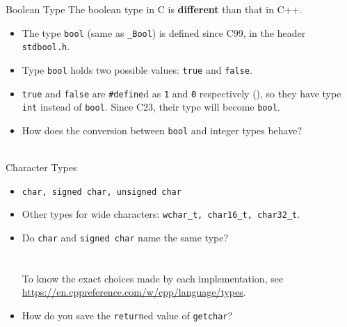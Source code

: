 \documentclass[handout]{beamer}
\begin{document}
\begin{frame}{Boolean Type}
    The boolean type in C is \textbf{different} than that in C++.
    \begin{itemize}
        \item The type \texttt{bool} (same as \texttt{\_Bool}) is defined since C99, in the header \texttt{stdbool.h}.
        \pause
        \item Type \texttt{bool} holds two possible values: \texttt{true} and \texttt{false}.
        \item \texttt{true} and \texttt{false} are \texttt{\#define}d as \texttt{1} and \texttt{0} respectively (), so they have type \texttt{int} instead of \texttt{bool}. Since C23, their type will become \texttt{bool}.
        \pause
        \item How does the conversion between \texttt{bool} and integer types behave?\\
        \pause
        \\
    \end{itemize}
\end{frame}

\begin{frame}{Character Types}
    \begin{itemize}
        \item \texttt{char, signed char, unsigned char}
        \item Other types for wide characters: \texttt{wchar\_t, char16\_t, char32\_t}.
        \pause
        \item Do \texttt{char} and \texttt{signed char} name the same type?\\
        \pause
        \\
        \\
        \pause
        To know the exact choices made by each implementation, see \url{https://en.cppreference.com/w/cpp/language/types}.
        \pause
        \item How do you save the \texttt{return}ed value of \texttt{getchar}?\\
        \pause
    \end{itemize}
\end{frame}
\end{document}
